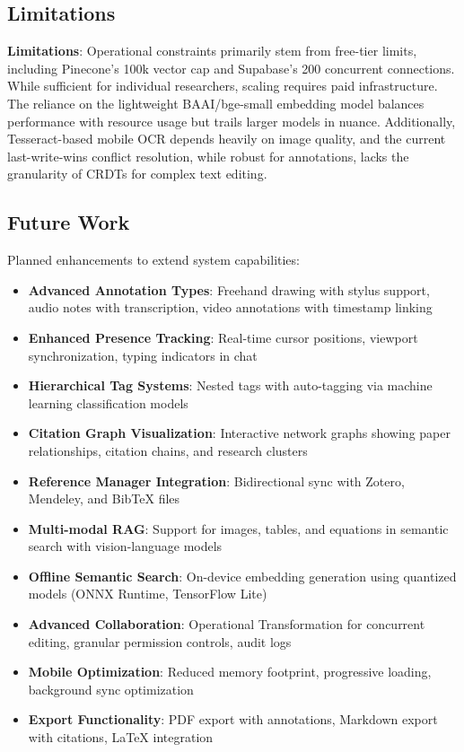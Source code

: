 \documentclass[conference]{IEEEtran}
\begin{document}
\subsection{Limitations}

\textbf{Limitations}: Operational constraints primarily stem from free-tier limits, including Pinecone's 100k vector cap and Supabase's 200 concurrent connections. While sufficient for individual researchers, scaling requires paid infrastructure. The reliance on the lightweight BAAI/bge-small embedding model balances performance with resource usage but trails larger models in nuance. Additionally, Tesseract-based mobile OCR depends heavily on image quality, and the current last-write-wins conflict resolution, while robust for annotations, lacks the granularity of CRDTs for complex text editing.

\subsection{Future Work}

Planned enhancements to extend system capabilities:

\begin{itemize}
\item \textbf{Advanced Annotation Types}: Freehand drawing with stylus support, audio notes with transcription, video annotations with timestamp linking
\item \textbf{Enhanced Presence Tracking}: Real-time cursor positions, viewport synchronization, typing indicators in chat
\item \textbf{Hierarchical Tag Systems}: Nested tags with auto-tagging via machine learning classification models
\item \textbf{Citation Graph Visualization}: Interactive network graphs showing paper relationships, citation chains, and research clusters
\item \textbf{Reference Manager Integration}: Bidirectional sync with Zotero, Mendeley, and BibTeX files
\item \textbf{Multi-modal RAG}: Support for images, tables, and equations in semantic search with vision-language models
\item \textbf{Offline Semantic Search}: On-device embedding generation using quantized models (ONNX Runtime, TensorFlow Lite)
\item \textbf{Advanced Collaboration}: Operational Transformation for concurrent editing, granular permission controls, audit logs
\item \textbf{Mobile Optimization}: Reduced memory footprint, progressive loading, background sync optimization
\item \textbf{Export Functionality}: PDF export with annotations, Markdown export with citations, LaTeX integration
\end{itemize}
\end{document}
